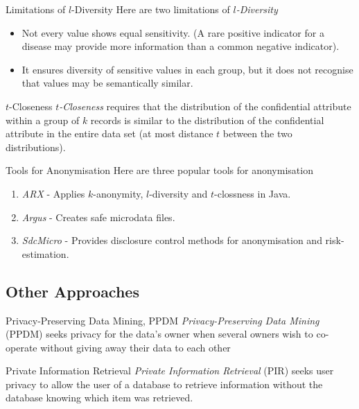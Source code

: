 \documentclass[11pt,a4paper]{article}
\begin{document}
  \begin{proposition}{Limitations of $l$-Diversity}
    Here are two limitations of \textit{$l$-Diversity}
    \begin{itemize}
      \item Not every value shows equal sensitivity. (A rare positive indicator for a disease may provide more information than a common negative indicator).
      \item It ensures diversity of sensitive values in each group, but it does not recognise that values may be semantically similar.
    \end{itemize}
  \end{proposition}

  \begin{definition}{$t$-Closeness}
    \textit{$t$-Closeness} requires that the distribution of the confidential attribute within a group of $k$ records is similar to the distribution of the confidential attribute in the entire data set (at most distance $t$ between the two distributions).
  \end{definition}

  \begin{remark}{Tools for Anonymisation}
    Here are three popular tools for anonymisation
    \begin{enumerate}
      \item \textit{ARX} - Applies $k$-anonymity, $l$-diversity and $t$-clossness in Java.
      \item \textit{Argus} - Creates safe microdata files.
      \item \textit{SdcMicro} - Provides disclosure control methods for anonymisation and risk-estimation.
    \end{enumerate}
  \end{remark}

\subsection{Other Approaches}\label{sec_other_approaches}

  \begin{definition}{Privacy-Preserving Data Mining, PPDM}
    \textit{Privacy-Preserving Data Mining} (PPDM) seeks privacy for the data's owner when several owners wish to co-operate without giving away their data to each other
  \end{definition}

  \begin{definition}{Private Information Retrieval}
    \textit{Private Information Retrieval} (PIR) seeks user privacy to allow the user of a database to retrieve information without the database knowing which item was retrieved.
  \end{definition}
\end{document}
